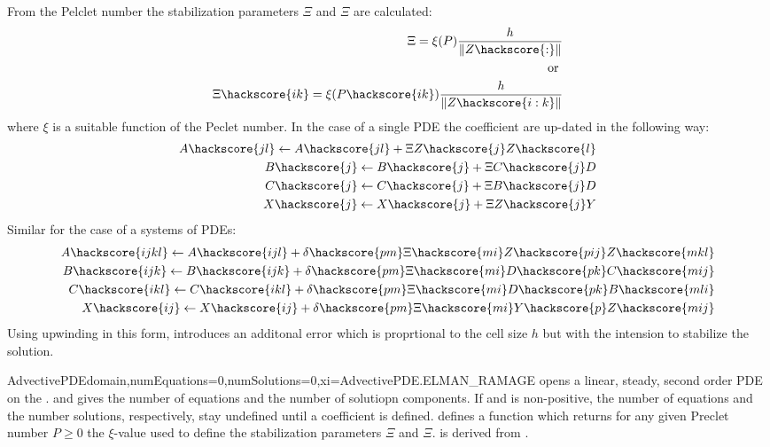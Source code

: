 From the Pelclet number the stabilization parameters $\Xi$ and $\Xi$ are calculated:
\begin{eqnarray}\label{LINEARPDE.Peclet.2}
\Xi=\xi(P) \frac{h}{\|Z\hackscore{:}\|}  \\
\mbox{ or } \\
\Xi\hackscore{ik}=\xi(P\hackscore{ik}) \frac{h}{\|Z\hackscore{i:k}\|}
\end{eqnarray}
where $\xi$ is a suitable function of the Peclet number.
In the case of a single PDE the coefficient are up-dated in the following way:
\begin{eqnarray}\label{LINEARPDE.ADVECTIVE.1}
A\hackscore{jl} \leftarrow A\hackscore{jl} + \Xi Z\hackscore{j} Z\hackscore{l} \\
B\hackscore{j} \leftarrow B\hackscore{j} + \Xi C\hackscore{j} D \\
C\hackscore{j} \leftarrow C\hackscore{j} + \Xi B\hackscore{j} D \\
X\hackscore{j} \leftarrow X\hackscore{j} + \Xi Z\hackscore{j} Y \\
\end{eqnarray}
Similar for the case of a systems of PDEs:
\begin{eqnarray}\label{LINEARPDE.ADVECTIVE.SYSTEM}
A\hackscore{ijkl} \leftarrow A\hackscore{ijl} + \delta\hackscore{pm} \Xi\hackscore{mi} Z\hackscore{pij} Z\hackscore{mkl} \\
B\hackscore{ijk} \leftarrow B\hackscore{ijk} +  \delta\hackscore{pm} \Xi\hackscore{mi} D\hackscore{pk} C\hackscore{mij} \\
C\hackscore{ikl} \leftarrow C\hackscore{ikl} +  \delta\hackscore{pm} \Xi\hackscore{mi} D\hackscore{pk} B\hackscore{mli} \\
X\hackscore{ij} \leftarrow X\hackscore{ij} + \delta\hackscore{pm} \Xi\hackscore{mi}  Y\hackscore{p} Z\hackscore{mij}\\
\end{eqnarray}
Using upwinding in this form, introduces an additonal error which is proprtional to the cell size $h$
but with the intension to stabilize the solution.

\begin{classdesc}{AdvectivePDE}{domain,numEquations=0,numSolutions=0,xi=AdvectivePDE.ELMAN_RAMAGE}
opens a linear, steady, second order PDE on the \Domain {}. 
and  gives the number of equations and the number of solutiopn components.
If  and  is non-positive, the number of equations 
and the number solutions, respectively, stay undefined until a coefficient is
defined.  defines a function which returns for any given  Preclet number $P\ge 0$ the 
$\xi$-value used to define the stabilization parameters $\Xi$ and $\Xi$.
\AdvectivePDE is derived from \LinearPDE.
\end{classdesc}

